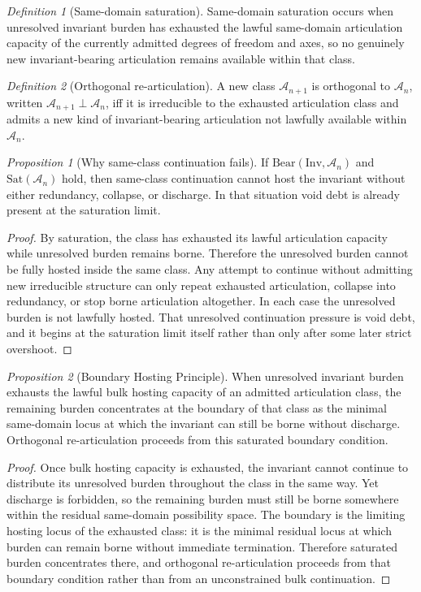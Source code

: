 \documentclass[11pt]{article}
\theoremstyle{definition}
\theoremstyle{plain}
\theoremstyle{remark}
\newtheorem{proposition}{Proposition}
\newtheorem{definition}{Definition}
\newcommand{\Inv}{\mathrm{Inv}}
\newcommand{\Sat}{\mathrm{Sat}}
\newcommand{\Bear}{\mathrm{Bear}}
\newcommand{\Aclass}{\mathcal{A}}
\begin{document}
\begin{definition}[Same-domain saturation]
\label{def:saturation}
Same-domain saturation occurs when unresolved invariant burden has exhausted the lawful same-domain articulation capacity of the currently admitted degrees of freedom and axes, so no genuinely new invariant-bearing articulation remains available within that class.
\end{definition}

\begin{definition}[Orthogonal re-articulation]
A new class $\Aclass_{n+1}$ is orthogonal to $\Aclass_n$, written $\Aclass_{n+1}\perp\Aclass_n$, iff it is irreducible to the exhausted articulation class and admits a new kind of invariant-bearing articulation not lawfully available within $\Aclass_n$.
\end{definition}

\begin{proposition}[Why same-class continuation fails]
If $\Bear(\Inv,\Aclass_n)$ and $\Sat(\Aclass_n)$ hold, then same-class continuation cannot host the invariant without either redundancy, collapse, or discharge. In that situation void debt is already present at the saturation limit.
\end{proposition}

\begin{proof}
By saturation, the class has exhausted its lawful articulation capacity while unresolved burden remains borne. Therefore the unresolved burden cannot be fully hosted inside the same class. Any attempt to continue without admitting new irreducible structure can only repeat exhausted articulation, collapse into redundancy, or stop borne articulation altogether. In each case the unresolved burden is not lawfully hosted. That unresolved continuation pressure is void debt, and it begins at the saturation limit itself rather than only after some later strict overshoot. 
\end{proof}

\begin{proposition}[Boundary Hosting Principle]
When unresolved invariant burden exhausts the lawful bulk hosting capacity of an admitted articulation class, the remaining burden concentrates at the boundary of that class as the minimal same-domain locus at which the invariant can still be borne without discharge. Orthogonal re-articulation proceeds from this saturated boundary condition.
\end{proposition}

\begin{proof}
Once bulk hosting capacity is exhausted, the invariant cannot continue to distribute its unresolved burden throughout the class in the same way. Yet discharge is forbidden, so the remaining burden must still be borne somewhere within the residual same-domain possibility space. The boundary is the limiting hosting locus of the exhausted class: it is the minimal residual locus at which burden can remain borne without immediate termination. Therefore saturated burden concentrates there, and orthogonal re-articulation proceeds from that boundary condition rather than from an unconstrained bulk continuation. 
\end{proof}
\end{document}
